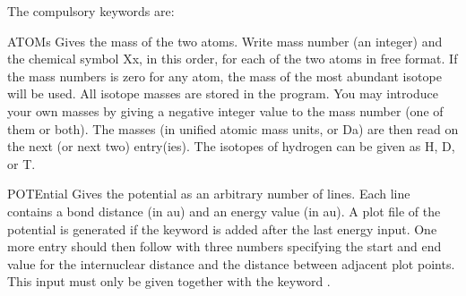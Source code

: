 The compulsory keywords are:
\begin{keywordlist}
\item[ATOMs]
Gives the mass of the two atoms. Write mass number (an integer) and the
chemical symbol Xx, in this order, for each of the two atoms in free format. If
the mass numbers is zero for any atom, the mass of the most abundant isotope
will be used. All isotope masses are stored in the program. You may introduce
your own masses by giving a negative integer value to the mass number (one of
them or both). The masses (in unified atomic mass units, or Da) are then read
on the next (or next two) entry(ies). The isotopes of hydrogen can be given as
H, D, or T.
\item[POTEntial]
Gives the potential as an arbitrary number of lines. Each line
contains a bond distance (in au) and an energy value (in au). A plot file of the
potential is generated if the keyword
 is added after the last energy input. One more entry should then follow
with three numbers
specifying the start and end value for the internuclear distance and
the distance between adjacent plot points. This input must only be
given together with the keyword .
\end{keywordlist}

